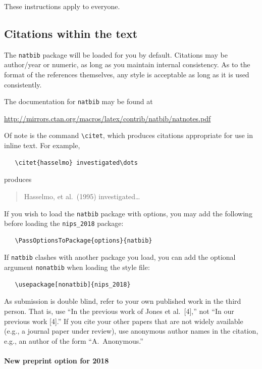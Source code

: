 \documentclass{article}
\begin{document}
These instructions apply to everyone.

\subsection{Citations within the text}

The \verb+natbib+ package will be loaded for you by default.
Citations may be author/year or numeric, as long as you maintain
internal consistency.  As to the format of the references themselves,
any style is acceptable as long as it is used consistently.

The documentation for \verb+natbib+ may be found at
\begin{center}
  \url{http://mirrors.ctan.org/macros/latex/contrib/natbib/natnotes.pdf}
\end{center}
Of note is the command \verb+\citet+, which produces citations
appropriate for use in inline text.  For example,
\begin{verbatim}
   \citet{hasselmo} investigated\dots
\end{verbatim}
produces
\begin{quote}
  Hasselmo, et al.\ (1995) investigated\dots
\end{quote}

If you wish to load the \verb+natbib+ package with options, you may
add the following before loading the \verb+nips_2018+ package:
\begin{verbatim}
   \PassOptionsToPackage{options}{natbib}
\end{verbatim}

If \verb+natbib+ clashes with another package you load, you can add
the optional argument \verb+nonatbib+ when loading the style file:
\begin{verbatim}
   \usepackage[nonatbib]{nips_2018}
\end{verbatim}

As submission is double blind, refer to your own published work in the
third person. That is, use ``In the previous work of Jones et
al.\ [4],'' not ``In our previous work [4].'' If you cite your other
papers that are not widely available (e.g., a journal paper under
review), use anonymous author names in the citation, e.g., an author
of the form ``A.\ Anonymous.''

\paragraph{New preprint option for 2018}
\end{document}
